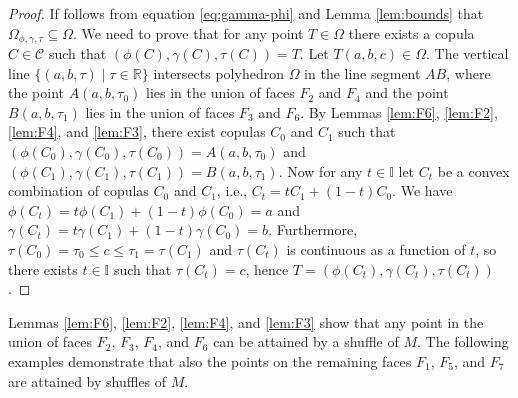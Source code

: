 \documentclass[12pt,a4paper]{amsart}
\theoremstyle{definition}
\newcommand{\II}{\mathbb{I}}
\newcommand{\RR}{\mathbb{R}}
\newcommand{\CC}{\mathcal{C}}
\begin{document}
\begin{proof}
If follows from equation \eqref{eq:gamma-phi} and Lemma \ref{lem:bounds} that $\Omega_{\phi, \gamma, \tau} \subseteq \Omega$. We need to prove that for any point $T \in \Omega$ there exists a copula $C\in\CC$ such that $(\phi(C), \gamma(C), \tau(C)) = T$. Let $T(a,b,c) \in \Omega$.
The vertical line $\{(a,b, \tau) \mid \tau \in \RR\}$ intersects polyhedron $\Omega$ in the line segment $AB$, where the point $A(a,b, \tau_0)$ lies in the union of faces $F_2$ and $F_4$ and the point $B(a,b, \tau_1)$ lies in the union of faces $F_3$ and $F_6$. By Lemmas \ref{lem:F6}, \ref{lem:F2}, \ref{lem:F4}, and \ref{lem:F3}, there exist copulas $C_0$ and $C_1$ such that $(\phi(C_0), \gamma(C_0), \tau(C_0)) = A(a,b, \tau_0)$ and $(\phi(C_1), \gamma(C_1), \tau(C_1)) = B(a,b, \tau_1)$.
Now for any $t \in \II$ let $C_t$ be a convex combination of copulas $C_0$ and $C_1$, i.e., $C_t = tC_1 + (1-t)C_0$. We have $\phi(C_t) = t\phi(C_1) + (1-t)\phi(C_0) = a$ and $\gamma(C_t) = t\gamma(C_1) + (1-t)\gamma(C_0) = b$. Furthermore, $\tau(C_0) = \tau_0 \le c \le \tau_1 = \tau(C_1)$ and $\tau(C_t)$ is continuous as a function of $t$, so there exists $t \in \II$ such that $\tau(C_t) = c$, hence $T=(\phi(C_t), \gamma(C_t), \tau(C_t))$.
\end{proof}

Lemmas \ref{lem:F6}, \ref{lem:F2}, \ref{lem:F4}, and \ref{lem:F3} show that any point in the union of faces $F_2$, $F_3$, $F_4$, and $F_6$ can be attained by a shuffle of $M$. The following examples demonstrate that also the points on the remaining faces $F_1$, $F_5$, and $F_7$ are attained by shuffles of $M$.
\end{document}

